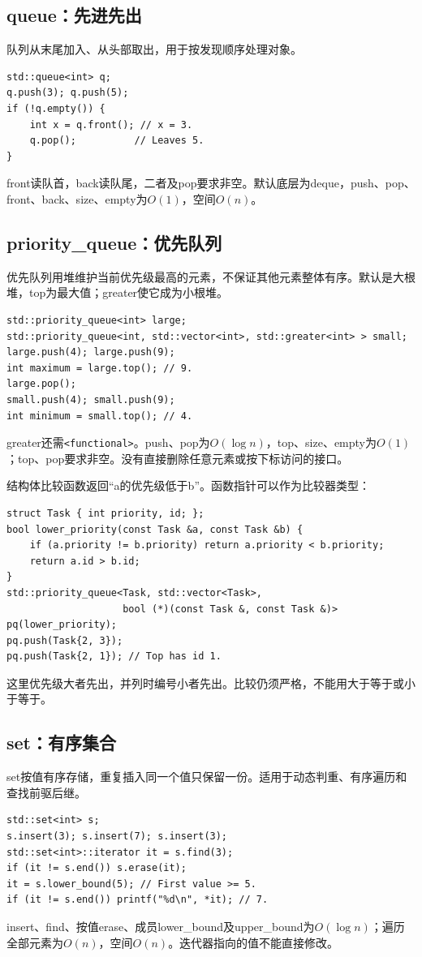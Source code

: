 \subsection{queue：先进先出}
队列从末尾加入、从头部取出，用于按发现顺序处理对象。
\begin{lstlisting}
std::queue<int> q;
q.push(3); q.push(5);
if (!q.empty()) {
    int x = q.front(); // x = 3.
    q.pop();          // Leaves 5.
}
\end{lstlisting}
front读队首，back读队尾，二者及pop要求非空。默认底层为deque，push、pop、front、back、size、empty为$O(1)$，空间$O(n)$。

\subsection{priority\_queue：优先队列}
优先队列用堆维护当前优先级最高的元素，不保证其他元素整体有序。默认是大根堆，top为最大值；greater使它成为小根堆。
\begin{lstlisting}
std::priority_queue<int> large;
std::priority_queue<int, std::vector<int>, std::greater<int> > small;
large.push(4); large.push(9);
int maximum = large.top(); // 9.
large.pop();
small.push(4); small.push(9);
int minimum = small.top(); // 4.
\end{lstlisting}
greater还需\texttt{<functional>}。push、pop为$O(\log n)$，top、size、empty为$O(1)$；top、pop要求非空。没有直接删除任意元素或按下标访问的接口。

结构体比较函数返回“a的优先级低于b”。函数指针可以作为比较器类型：
\begin{lstlisting}
struct Task { int priority, id; };
bool lower_priority(const Task &a, const Task &b) {
    if (a.priority != b.priority) return a.priority < b.priority;
    return a.id > b.id;
}
std::priority_queue<Task, std::vector<Task>,
                    bool (*)(const Task &, const Task &)> pq(lower_priority);
pq.push(Task{2, 3});
pq.push(Task{2, 1}); // Top has id 1.
\end{lstlisting}
这里优先级大者先出，并列时编号小者先出。比较仍须严格，不能用大于等于或小于等于。

\subsection{set：有序集合}
set按值有序存储，重复插入同一个值只保留一份。适用于动态判重、有序遍历和查找前驱后继。
\begin{lstlisting}
std::set<int> s;
s.insert(3); s.insert(7); s.insert(3);
std::set<int>::iterator it = s.find(3);
if (it != s.end()) s.erase(it);
it = s.lower_bound(5); // First value >= 5.
if (it != s.end()) printf("%d\n", *it); // 7.
\end{lstlisting}
insert、find、按值erase、成员lower\_bound及upper\_bound为$O(\log n)$；遍历全部元素为$O(n)$，空间$O(n)$。迭代器指向的值不能直接修改。

